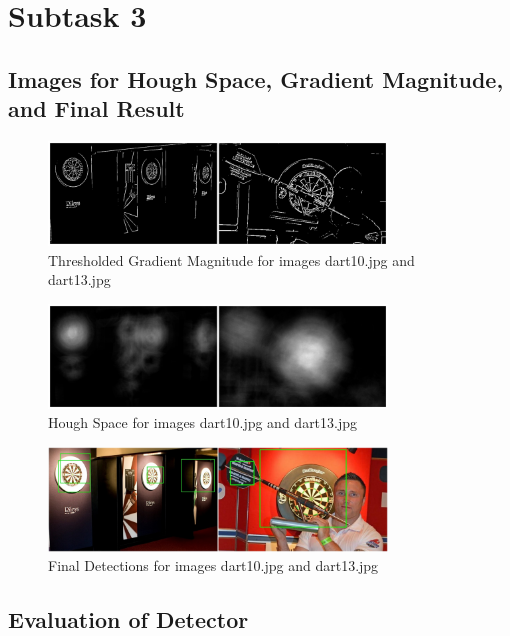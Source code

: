 \documentclass[conference]{IEEEtran}
\begin{document}
\newpage

\section{Subtask 3}

\subsection{Images for Hough Space, Gradient Magnitude, and Final Result}

\begin{figure}[ht!]
	\centering
	\includegraphics[width=90mm]{img/Task3_Images/threshold_dart.jpg}
	\caption{Thresholded Gradient Magnitude for images dart10.jpg and dart13.jpg}
	\label{ThresholdGM}
\end{figure}


\begin{figure}[ht!]
	\centering
	\includegraphics[width=90mm]{img/Task3_Images/houghspace_dart.jpg}
	\caption{Hough Space for images dart10.jpg and dart13.jpg}
\end{figure}

\begin{figure}[ht!]
	\centering
	\includegraphics[width=90mm]{img/Task3_Images/detected_dart.jpg}
	\caption{Final Detections for images dart10.jpg and dart13.jpg}
\end{figure}

\subsection{Evaluation of Detector}
\end{document}
